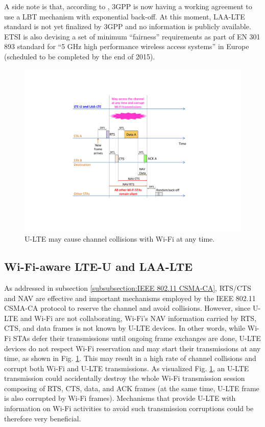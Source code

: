 \documentclass[journal,draftclsnofoot,12pt,onecolumn]{IEEEtran}
\begin{document}
A side note is that, according to \cite{U-LTE-FCC-Cisco-2015}, 3GPP is now having a working agreement to use a LBT mechanism with exponential back-off. At this moment, LAA-LTE standard is not yet finalized by 3GPP and no information is publicly available. ETSI is also devising a set of minimum ``fairness'' requirements as part of EN 301 893 standard for ``5 GHz high performance wireless access systems'' in Europe (scheduled to be completed by the end of 2015).

\begin{figure}[!t]
\centering
\includegraphics[width=0.7\columnwidth]{figures2/LTE-U-enhancement-RTS-CTS-NAV}
\caption{U-LTE may cause channel collisions with Wi-Fi at any time.}
\label{figs:LTE-U-enhancement-RTS-CTS-NAV}
\end{figure}

\subsection{Wi-Fi-aware LTE-U and LAA-LTE}
\label{subsection:Wi-Fi-aware}

As addressed in subsection \ref{subsubsection:IEEE 802.11 CSMA-CA}, RTS/CTS and NAV are effective and important mechanisms employed by the IEEE 802.11 CSMA-CA protocol to reserve the channel and avoid collisions. However, since U-LTE and Wi-Fi are not collaborating, Wi-Fi's NAV information carried by RTS, CTS, and data frames is not known by U-LTE devices. In other words, while Wi-Fi STAs defer their transmissions until ongoing frame exchanges are done, U-LTE devices do not respect Wi-Fi reservation and may start their transmissions at any time, as shown in Fig. \ref{figs:LTE-U-enhancement-RTS-CTS-NAV}. This may result in a high rate of channel collisions and corrupt both Wi-Fi and U-LTE transmissions. As visualized Fig. \ref{figs:LTE-U-enhancement-RTS-CTS-NAV}, an U-LTE transmission could accidentally destroy the whole Wi-Fi transmission session composing of RTS, CTS, data, and ACK frames (at the same time, U-LTE frame is also corrupted by Wi-Fi frames). Mechanisms that provide U-LTE with information on Wi-Fi activities to avoid such transmission corruptions could be therefore very beneficial.
\end{document}
